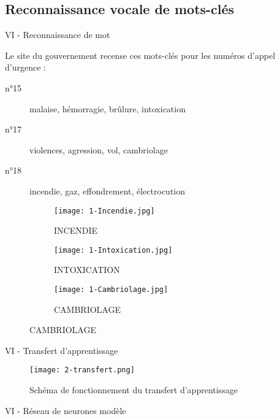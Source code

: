 \subsection{Reconnaissance vocale de mots-clés}


\begin{frame}{VI - Reconnaissance de mot}
	\begin{block}{}
		Le site du gouvernement recense ces mots-clés pour les numéros d'appel d'urgence : \\
		\begin{description}
			\item[n°15] malaise, hémorragie, brûlure, intoxication
			\item[n°17] violences, agression, vol, cambriolage
			\item[n°18] incendie, gaz, effondrement, électrocution
		\end{description}
	\end{block}
	\begin{figure}
		\begin{subfigure}[]{0.3\textwidth}
			\texttt{[image: 1-Incendie.jpg]}
			\caption{INCENDIE}
		\end{subfigure}
		\begin{subfigure}[]{0.3\textwidth}
			\texttt{[image: 1-Intoxication.jpg]}
			\caption{INTOXICATION}
		\end{subfigure}
		\begin{subfigure}[]{0.3\textwidth}
			\texttt{[image: 1-Cambriolage.jpg]}
			\caption{CAMBRIOLAGE}
		\end{subfigure}
	\end{figure}
\end{frame}


\begin{frame}{VI - Transfert d'apprentissage}
	\begin{figure}
		\texttt{[image: 2-transfert.png]}
		\caption{Schéma de fonctionnement du transfert d'apprentissage}
	\end{figure}
\end{frame}


\begin{frame}{VI - Réseau de neurones modèle}
	
\end{frame}


